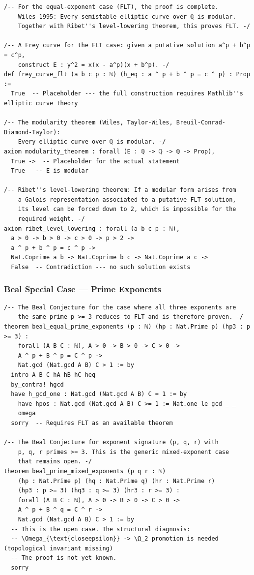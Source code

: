 \documentclass[12pt,a4paper]{article}
\begin{document}
\begin{lstlisting}[language=lean4]
/-- For the equal-exponent case (FLT), the proof is complete.
    Wiles 1995: Every semistable elliptic curve over ℚ is modular.
    Together with Ribet''s level-lowering theorem, this proves FLT. -/

/-- A Frey curve for the FLT case: given a putative solution a^p + b^p = c^p,
    construct E : y^2 = x(x - a^p)(x + b^p). -/
def frey_curve_flt (a b c p : ℕ) (h_eq : a ^ p + b ^ p = c ^ p) : Prop :=
  True  -- Placeholder --- the full construction requires Mathlib''s elliptic curve theory

/-- The modularity theorem (Wiles, Taylor-Wiles, Breuil-Conrad-Diamond-Taylor):
    Every elliptic curve over ℚ is modular. -/
axiom modularity_theorem : forall (E : ℚ -> ℚ -> ℚ -> Prop),
  True ->  -- Placeholder for the actual statement
  True   -- E is modular

/-- Ribet''s level-lowering theorem: If a modular form arises from
    a Galois representation associated to a putative FLT solution,
    its level can be forced down to 2, which is impossible for the
    required weight. -/
axiom ribet_level_lowering : forall (a b c p : ℕ),
  a > 0 -> b > 0 -> c > 0 -> p > 2 ->
  a ^ p + b ^ p = c ^ p ->
  Nat.Coprime a b -> Nat.Coprime b c -> Nat.Coprime a c ->
  False  -- Contradiction --- no such solution exists
\end{lstlisting}

\subsubsection{Beal Special Case --- Prime Exponents}

\begin{lstlisting}[language=lean4]
/-- The Beal Conjecture for the case where all three exponents are
    the same prime p >= 3 reduces to FLT and is therefore proven. -/
theorem beal_equal_prime_exponents (p : ℕ) (hp : Nat.Prime p) (hp3 : p >= 3) :
    forall (A B C : ℕ), A > 0 -> B > 0 -> C > 0 ->
    A ^ p + B ^ p = C ^ p ->
    Nat.gcd (Nat.gcd A B) C > 1 := by
  intro A B C hA hB hC heq
  by_contra! hgcd
  have h_gcd_one : Nat.gcd (Nat.gcd A B) C = 1 := by
    have hpos : Nat.gcd (Nat.gcd A B) C >= 1 := Nat.one_le_gcd _ _
    omega
  sorry  -- Requires FLT as an available theorem

/-- The Beal Conjecture for exponent signature (p, q, r) with
    p, q, r primes >= 3. This is the generic mixed-exponent case
    that remains open. -/
theorem beal_prime_mixed_exponents (p q r : ℕ) 
    (hp : Nat.Prime p) (hq : Nat.Prime q) (hr : Nat.Prime r)
    (hp3 : p >= 3) (hq3 : q >= 3) (hr3 : r >= 3) :
    forall (A B C : ℕ), A > 0 -> B > 0 -> C > 0 ->
    A ^ p + B ^ q = C ^ r ->
    Nat.gcd (Nat.gcd A B) C > 1 := by
  -- This is the open case. The structural diagnosis:
  -- \Omega_{\text{closeepsilon}} -> \Ω_2 promotion is needed (topological invariant missing)
  -- The proof is not yet known.
  sorry
\end{lstlisting}
\end{document}
